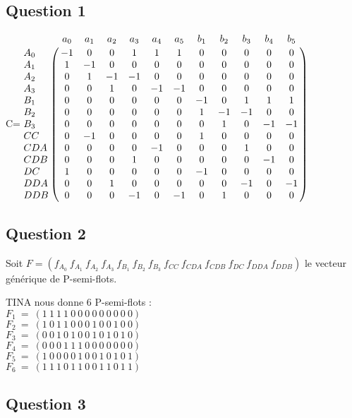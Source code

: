 \subsection{Question 1}

\vspace{1cm}

\begin{center}

{\Huge C}\qquad =\qquad $\bordermatrix{
   &a_0&a_1&a_2&a_3&a_4&a_5&b_1&b_2&b_3&b_4&b_5\cr
A_0&-1 & 0 & 0 & 1 & 1 & 1 & 0 & 0 & 0 & 0 & 0\cr
A_1& 1 &-1 & 0 & 0 & 0 & 0 & 0 & 0 & 0 & 0 & 0\cr
A_2& 0 & 1 &-1 &-1 & 0 & 0 & 0 & 0 & 0 & 0 & 0\cr
A_3& 0 & 0 & 1 & 0 &-1 &-1 & 0 & 0 & 0 & 0 & 0\cr
B_1& 0 & 0 & 0 & 0 & 0 & 0 &-1 & 0 & 1 & 1 & 1\cr
B_2& 0 & 0 & 0 & 0 & 0 & 0 & 1 &-1 &-1 & 0 & 0\cr
B_3& 0 & 0 & 0 & 0 & 0 & 0 & 0 & 1 & 0 &-1 &-1\cr
CC & 0 &-1 & 0 & 0 & 0 & 0 & 1 & 0 & 0 & 0 & 0\cr
CDA& 0 & 0 & 0 & 0 &-1 & 0 & 0 & 0 & 1 & 0 & 0\cr
CDB& 0 & 0 & 0 & 1 & 0 & 0 & 0 & 0 & 0 &-1 & 0\cr
DC & 1 & 0 & 0 & 0 & 0 & 0 &-1 & 0 & 0 & 0 & 0\cr
DDA& 0 & 0 & 1 & 0 & 0 & 0 & 0 & 0 &-1 & 0 &-1\cr
DDB& 0 & 0 & 0 &-1 & 0 &-1 & 0 & 1 & 0 & 0 & 0\cr
}$

\end{center}

\subsection{Question 2}

Soit $F=(f_{A_0}\ f_{A_1}\ f_{A_2}\ f_{A_3}\ f_{B_1}\ f_{B_2}\ f_{B_3}\ f_{CC}\ f_{CDA}\ f_{CDB}\ f_{DC}\ f_{DDA}\ f_{DDB})$ le vecteur générique de P-semi-flots.

TINA nous donne 6 P-semi-flots :\\
$F_1\ =\ (1\ 1\ 1\ 1\ 0\ 0\ 0\ 0\ 0\ 0\ 0\ 0\ 0)$\\
$F_2\ =\ (1\ 0\ 1\ 1\ 0\ 0\ 0\ 1\ 0\ 0\ 1\ 0\ 0)$\\
$F_3\ =\ (0\ 0\ 1\ 0\ 1\ 0\ 0\ 1\ 0\ 1\ 0\ 1\ 0)$\\
$F_4\ =\ (0\ 0\ 0\ 1\ 1\ 1\ 0\ 0\ 0\ 0\ 0\ 0\ 0)$\\
$F_5\ =\ (1\ 0\ 0\ 0\ 0\ 1\ 0\ 0\ 1\ 0\ 1\ 0\ 1)$\\
$F_6\ =\ (1\ 1\ 1\ 0\ 1\ 1\ 0\ 0\ 1\ 1\ 0\ 1\ 1)$\\

\subsection{Question 3}

